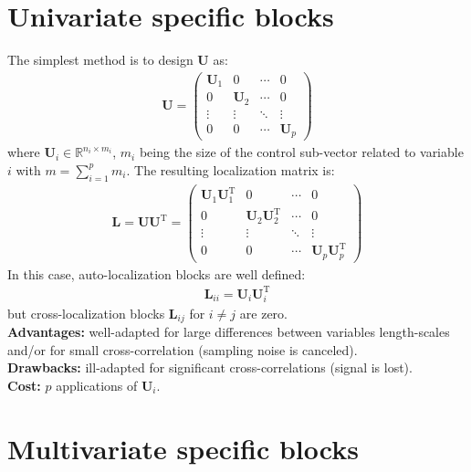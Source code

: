 \documentclass[12pt]{scrartcl}
\begin{document}
\section{Univariate specific blocks}
The simplest method is to design $\mathbf{U}$ as:
\begin{align}
\mathbf{U} = \left( \begin{array}{cccc}
\mathbf{U}_1 & 0 & \cdots & 0 \\
0 & \mathbf{U}_2 & \cdots & 0 \\
\vdots & \vdots & \ddots & \vdots \\
0 & 0 & \cdots & \mathbf{U}_p
\end{array} \right)
\end{align}
where $\mathbf{U}_i \in \mathbb{R}^{n_i \times m_i}$, $m_i$ being the size of the control sub-vector related to variable $i$ with $\displaystyle m = \sum_{i=1}^p m_i$. The resulting localization matrix is:
\begin{align}
\mathbf{L} = \mathbf{U} \mathbf{U}^\mathrm{T} = \left( \begin{array}{cccc}
\mathbf{U}_1 \mathbf{U}_1^\mathrm{T} & 0 & \cdots & 0 \\
0 & \mathbf{U}_2 \mathbf{U}_2^\mathrm{T} & \cdots & 0 \\
\vdots & \vdots & \ddots & \vdots \\
0 & 0 & \cdots & \mathbf{U}_p \mathbf{U}_p^\mathrm{T} 
\end{array} \right)
\end{align}
In this case, auto-localization blocks are well defined:
\begin{align}
\mathbf{L}_{ii} = \mathbf{U}_i \mathbf{U}_i^\mathrm{T}
\end{align}
but cross-localization blocks $\mathbf{L}_{ij}$ for $i \ne j$ are zero.\\
$  $\\
\textbf{Advantages:} well-adapted for large differences between variables length-scales and/or for small cross-correlation (sampling noise is canceled).\\
\textbf{Drawbacks:} ill-adapted for significant cross-correlations (signal is lost).\\
\textbf{Cost:} $p$ applications of $\mathbf{U}_i$.

\section{Multivariate specific blocks}
\end{document}
